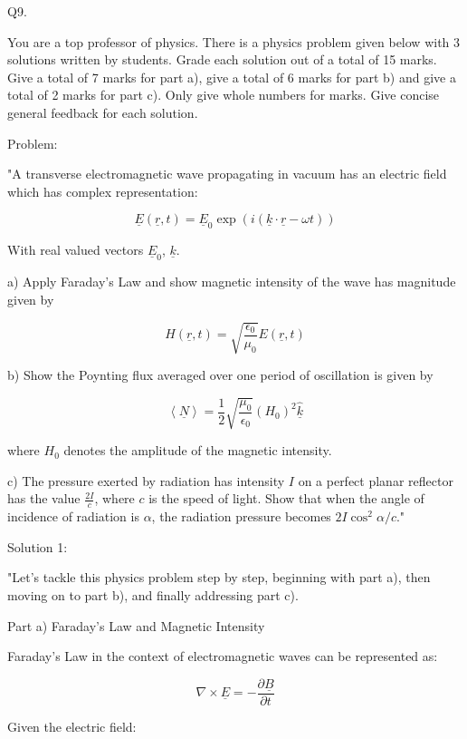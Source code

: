                               Q9. 

You are a top professor of physics. There is a physics problem given below with 3 solutions written by students. Grade each solution out of a total of 15 marks. Give a total of 7 marks for part a), give a total of 6 marks for part b) and give a total of 2 marks for part c). Only give whole numbers for marks. Give concise general feedback for each solution. 

Problem:

"A transverse electromagnetic wave propagating in vacuum has an electric field which has complex representation:

\[ \underline{E}(\underline{r}, t) = \underline{E}_{0} \exp (i(\underline{k} \cdot \underline{r} - \omega t)) \]

With real valued vectors \( \underline{E}_{0} \), \( \underline{k} \).

a) Apply Faraday’s Law and show magnetic intensity of the wave has magnitude given by 

\[ H(\underline{r}, t) = \sqrt{\frac{\epsilon_{0}}{\mu_{0}}} E(\underline{r}, t) \]

b) Show the Poynting flux averaged over one period of oscillation is given by 

\[ \left< \underline{N} \right> = \frac{1}{2} \sqrt{\frac{\mu_{0}}{\epsilon_{0}}} (H_{0})^{2} \hat{\underline{k}} \]

where \( H_{0} \) denotes the amplitude of the magnetic intensity.
    
c) The pressure exerted by radiation has intensity \( I \) on a perfect planar reflector has the value \( \frac{2I}{c} \), where \( c \) is the speed of light. Show that when the angle of incidence of radiation is \( \alpha \), the radiation pressure becomes \( 2I\cos^{2}{\alpha}/{c} \)."

Solution 1:

"Let's tackle this physics problem step by step, beginning with part a), then moving on to part b), and finally addressing part c).

Part a) Faraday’s Law and Magnetic Intensity

Faraday's Law in the context of electromagnetic waves can be represented as:

\[
\nabla \times \underline{E} = -\frac{\partial \underline{B}}{\partial t}
\]

Given the electric field:

